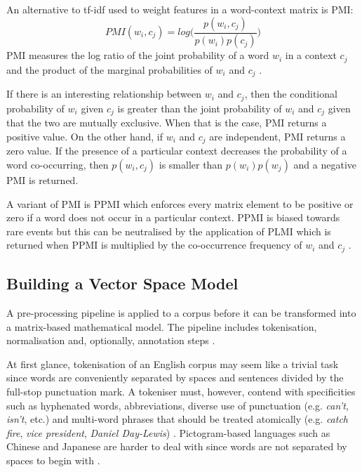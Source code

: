 An alternative to \ac{tf-idf} used to weight features in a word-context matrix is \ac{PMI}:
\[PMI(w_i, c_j) = log \Bigg( \frac{p(w_i, c_j)}{p(w_i)p(c_j)} \Bigg) \]
\ac{PMI} measures the log ratio of the joint probability of a word $w_i$ in a context $c_j$ and the product of the marginal probabilities of $w_i$ and $c_j$ \citep{church1990word}.

If there is an interesting relationship between $w_i$ and $c_j$, then the conditional probability of $w_i$ given $c_j$ is greater than the joint probability of $w_i$ and $c_j$ given that the two are mutually exclusive.  When that is the case, \ac{PMI} returns a positive value.  On the other hand, if $w_i$ and $c_j$ are independent, \ac{PMI} returns a zero value.  If the presence of a particular context decreases the probability of a word co-occurring, then $p(w_i, c_j)$ is smaller than $p(w_i)p(w_j)$ and a negative \ac{PMI} is returned.

A variant of \ac{PMI} is \ac{PPMI} which enforces every matrix element to be positive or zero if a word does not occur in a particular context.  \ac{PPMI} is biased towards rare events \citep{turney2010frequency} but this can be neutralised by the application of \ac{PLMI} which is returned when \ac{PPMI} is multiplied by the co-occurrence frequency of $w_i$ and $c_j$ \citep{evert2008corpora}.

\subsection{Building a Vector Space Model}
A pre-processing pipeline is applied to a corpus before it can be transformed into a matrix-based mathematical model.  The pipeline includes tokenisation, normalisation and, optionally, annotation steps \citep{turney2010frequency}.

At first glance, tokenisation of an English corpus may seem like a trivial task since words are conveniently separated by spaces and sentences divided by the full-stop punctuation mark.  A tokeniser must, however, contend with specificities such as hyphenated words, abbreviations, diverse use of punctuation (e.g. \textit{can’t}, \textit{isn’t}, etc.) and multi-word phrases that should be treated atomically (e.g. \textit{catch fire}, \textit{vice president}, \textit{Daniel Day-Lewis}) .  Pictogram-based languages such as Chinese and Japanese are harder to deal with since words are not separated by spaces to begin with \citep{turney2010frequency}.

